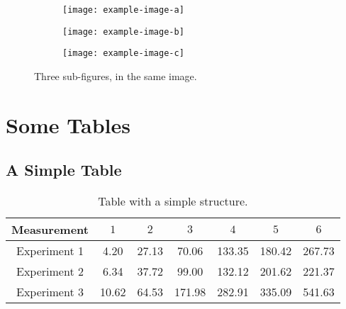 \begin{figure}[!ht]
	\begin{subfigure}[t]{.40\textwidth}
		\centering
		\texttt{[image: example-image-a]}
		\label{subfig1:first_image}
	\end{subfigure}
	\hspace{.10\textwidth}
	\begin{subfigure}[t]{.40\textwidth}
		\centering
		\texttt{[image: example-image-b]}
		\label{subfig1:second_image}
	\end{subfigure}
	\centering
	\begin{subfigure}[t]{.40\textwidth}
		\centering
		\texttt{[image: example-image-c]}
		\label{subfig1:third_image}
	\end{subfigure}
	\caption{Three sub-figures, in the same image.}
	\label{fig1:three_images}
\end{figure}

\section{Some Tables}

\subsection{A Simple Table}

\begin{table}[ht!]
	\centering
	\begin{tabular}{c c c c c c c}
		\toprule
		\textbf{Measurement} & 
		$1$ & 	$2$ & 	$3$ & 	$4$ & 	$5$ & $6$ 
		\\
		\midrule
		Experiment 1 
		& \num{4.20}	
		& \num{27.13}	
		& \num{70.06}	
		& \num{133.35}	
		& \num{180.42}	
		& \num{267.73}	\\ 
		Experiment 2 
		& \num{6.34}	
		& \num{37.72}	
		& \num{99.00}	
		& \num{132.12}	
		& \num{201.62}	
		& \num{221.37}	\\ 
		Experiment 3 
		& \num{10.62}	
		& \num{64.53}	
		& \num{171.98}	
		& \num{282.91}	
		& \num{335.09}	
		& \num{541.63}  \\
		\bottomrule
	\end{tabular}
	\caption{Table with a simple structure.}
	\label{tab4:tauform_vals}
\end{table}



